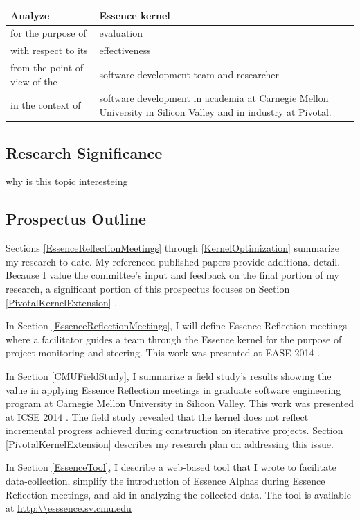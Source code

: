 \documentclass[preprint,12pt,3p]{elsarticle}
\begin{document}
\begin{table}[h]
\centering
\begin{tabular}{|p{2.00in}|p{4.10in}|}
\hline
Analyze & Essence kernel  \\ \hline
for the purpose of & evaluation \\ \hline
with respect to its & effectiveness \\ \hline
from the point of view of the & software development team and researcher \\ \hline
in the context of & software development in academia at Carnegie Mellon University in Silicon Valley and in industry at Pivotal. \\
\hline
\end{tabular}
\end{table}

\subsection{Research Significance}

why is this topic interesteing


\subsection{Prospectus Outline}

Sections \ref{EssenceReflectionMeetings} through \ref{KernelOptimization} summarize my research to date. My referenced published papers provide additional detail. Because I value the committee's input and feedback on the final portion of my research, a significant portion of this prospectus focuses on Section \ref{PivotalKernelExtension} . 

In Section \ref{EssenceReflectionMeetings}, I will define Essence Reflection meetings where a facilitator guides a team through the Essence kernel for the purpose of project monitoring and steering. This work was presented at EASE 2014 \cite{EASE2014}.

In Section \ref{CMUFieldStudy}, I summarize a field study's results showing the value in applying Essence Reflection meetings in graduate software engineering program at Carnegie Mellon University in Silicon Valley. This work was presented at ICSE 2014 \cite{ICSE2014}. The field study revealed that the kernel does not reflect incremental progress achieved during construction on iterative projects. Section \ref{PivotalKernelExtension} describes my research plan on addressing this issue.

In Section \ref{EssenceTool}, I describe a web-based tool that I wrote to facilitate data-collection, simplify the introduction of Essence Alphas during Essence Reflection meetings, and aid in analyzing the collected data. The tool is available at \url{http:\\esssence.sv.cmu.edu}
\end{document}
